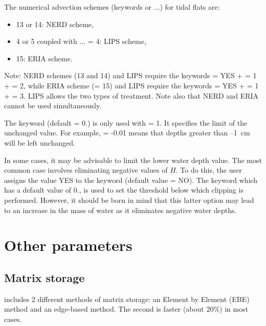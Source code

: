 The numerical advection schemes (keywords 
or ...) for tidal flats are:
\begin{itemize}
\item 13 or 14: NERD scheme,
\item 4 or 5 coupled with ... = 4:
LIPS scheme,
\item 15: ERIA scheme.
\end{itemize}

\begin{WarningBlock}{Note:}
NERD schemes (13 and 14) and LIPS require the keywords
   = YES
+  = 1
+  = 2,
while ERIA scheme (= 15) and LIPS require the keywords
   = YES
+  = 1
+  = 3.
LIPS allows the two types of treatment.
Note also that NERD and ERIA cannot be used simultaneously.
\end{WarningBlock}

The keyword  (default = 0.)
is only used with  = 1.
It specifies the limit of the unchanged value.
For example,  = -0.01 means
that depths greater than --1~cm will be left unchanged.

In some cases, it may be advisable to limit the lower water depth value.
The most common case involves eliminating negative values of $H$.
To do this, the user assigns the value YES to the keyword 
(default value = NO).
The keyword  which has a default value of 0.,
is used to set the threshold below which clipping is performed.
However, it should be born in mind that this latter option may lead
to an increase in the mass of water as it eliminates negative water depths.

\section{Other parameters}

\subsection{Matrix storage}

 includes 2 different methods of matrix storage:
an Element by Element (EBE) method and an edge-based method.
The second is faster (about 20\%) in most cases.

